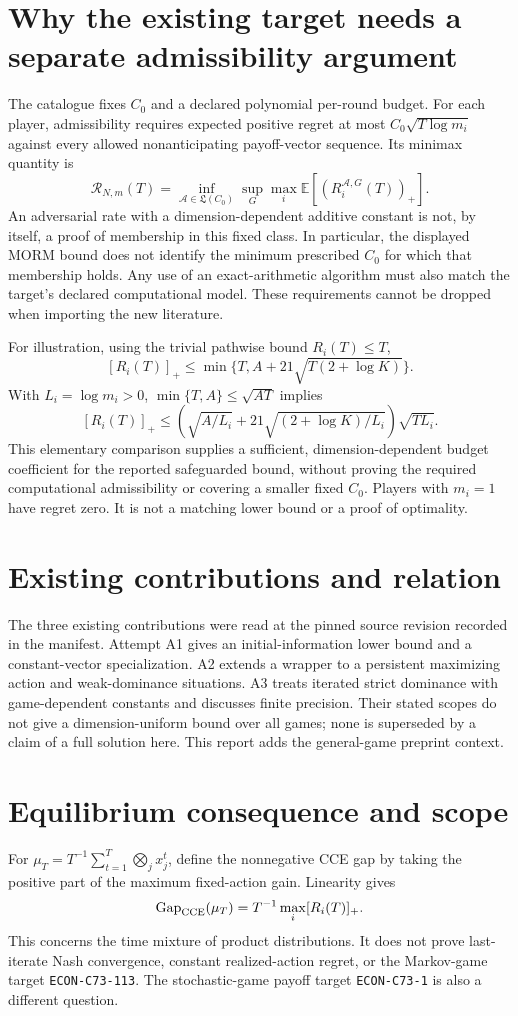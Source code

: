 \documentclass[11pt]{article}
\begin{document}
\section*{Why the existing target needs a separate admissibility argument}
The catalogue fixes $C_0$ and a declared polynomial per-round budget.
For each player, admissibility requires expected positive regret at most
$C_0\sqrt{T\log m_i}$ against every allowed nonanticipating payoff-vector
sequence. Its minimax quantity is
\[
 \mathcal R_{N,m}(T)=\inf_{\mathcal A\in\mathfrak L(C_0)}\sup_G
 \max_i\mathbb E[(R_i^{\mathcal A,G}(T))_+].
\]
An adversarial rate with a dimension-dependent additive constant is not,
by itself, a proof of membership in this fixed class. In particular, the
displayed MORM bound does not identify the minimum prescribed $C_0$ for
which that membership holds. Any use of an exact-arithmetic algorithm
must also match the target's declared computational model. These
requirements cannot be dropped when importing the new literature.

For illustration, using the trivial pathwise bound $R_i(T)\leq T$,
\[
 [R_i(T)]_+\leq
 \min\{T,A+21\sqrt{T(2+\log K)}\}.
\]
With $L_i=\log m_i>0$, $\min\{T,A\}\leq\sqrt{AT}$ implies
\[
 [R_i(T)]_+\leq
 \left(\sqrt{A/L_i}+21\sqrt{(2+\log K)/L_i}\right)
 \sqrt{TL_i}.
\]
This elementary comparison supplies a sufficient, dimension-dependent
budget coefficient for the reported safeguarded bound, without proving
the required computational admissibility or covering a smaller fixed
$C_0$. Players with $m_i=1$ have regret zero. It is not a matching lower
bound or a proof of optimality.

\section*{Existing contributions and relation}
The three existing contributions were read at the pinned source revision
recorded in the manifest. Attempt A1 gives an initial-information lower
bound and a constant-vector specialization. A2 extends a wrapper to a
persistent maximizing action and weak-dominance situations. A3 treats
iterated strict dominance with game-dependent constants and discusses
finite precision. Their stated scopes do not give a dimension-uniform
bound over all games; none is superseded by a claim of a full solution
here. This report adds the general-game preprint context.

\section*{Equilibrium consequence and scope}
For $\mu_T=T^{-1}\sum_{t=1}^T\bigotimes_jx_j^t$, define the nonnegative
CCE gap by taking the positive part of the maximum fixed-action gain.
Linearity gives
\[
 \operatorname{Gap}_{\rm CCE}(\mu_T)
   =T^{-1}\max_i[R_i(T)]_+.
\]
This concerns the time mixture of product distributions. It does not
prove last-iterate Nash convergence, constant realized-action regret,
or the Markov-game target \texttt{ECON-C73-113}. The stochastic-game
payoff target \texttt{ECON-C73-1} is also a different question.
\end{document}
